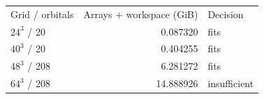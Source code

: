 \begin{tabular}{lrl}
\toprule
Grid / orbitals & Arrays + workspace (GiB) & Decision \\
$24^3$ / 20 & 0.087320 & fits \\
$40^3$ / 20 & 0.404255 & fits \\
$48^3$ / 208 & 6.281272 & fits \\
$64^3$ / 208 & 14.888926 & insufficient \\
\bottomrule
\end{tabular}

